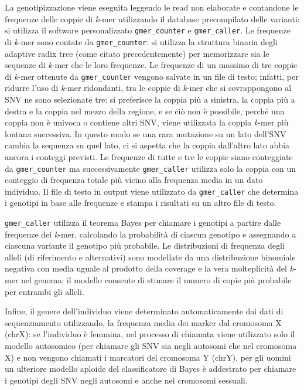 \documentclass[../main.tex]{subfiles}
\begin{document}
\noindent
La genotipizzazione viene eseguita leggendo le read non elaborate e contandone le frequenze delle coppie di \textit{k}-mer utilizzando il database precompilato delle varianti: si utilizza il software personalizzato \texttt{gmer\_counter} e \texttt{gmer\_caller}. Le frequenze di \textit{k}-mer sono contate da \texttt{gmer\_counter}: si utilizza la struttura binaria degli adaptive radix tree (come citato precedentemente) per memorizzare sia le sequenze di \textit{k}-mer che le loro frequenze. Le frequenze di un massimo di tre coppie di \textit{k}-mer ottenute da \texttt{gmer\_counter} vengono salvate in un file di testo; infatti, per ridurre l'uso di \textit{k}-mer ridondanti, tra le coppie di \textit{k}-mer che si sovrappongono al SNV ne sono selezionate tre: si preferisce la coppia più a sinistra, la coppia più a destra e la coppia nel mezzo della regione, e se ciò non è possibile, perché una coppia non è univoca o contiene altri SNV, viene utilizzata la coppia \textit{k}-mer più lontana successiva. In questo modo se una rara mutazione su un lato dell'SNV cambia la sequenza su quel lato, ci si aspetta che la coppia dall'altro lato abbia ancora i conteggi previsti. Le frequenze di tutte e tre le coppie siano conteggiate da \texttt{gmer\_counter} ma successivamente \texttt{gmer\_caller} utilizza solo la coppia con un conteggio di frequenza totale più vicino alla frequenza media in un dato individuo. Il file di testo in output viene utilizzato da \texttt{gmer\_caller} che determina i genotipi in base alle frequenze e stampa i risultati su un altro file di testo. 

\texttt{gmer\_caller} utilizza il teorema Bayes per chiamare i genotipi a partire dalle frequenze dei \textit{k}-mer, calcolando la probabilità di ciascun genotipo e assegnando a ciascuna variante il genotipo più probabile. Le distribuzioni di frequenza degli alleli (di riferimento e alternativi) sono modellate da una distribuzione binomiale negativa con media uguale al prodotto della coverage e la vera molteplicità del \textit{k}-mer nel genoma; il modello consente di stimare il numero di copie più probabile per entrambi gli alleli. 


Infine, il genere dell'individuo viene determinato automaticamente dai dati di sequenziamento utilizzando, la frequenza media dei marker dal cromosoma X (chrX): se l'individuo è femmina, nel processo di chiamata viene utilizzato solo il modello autosomico (per chiamare gli SNV sia negli autosomi che nel cromosoma X) e non vengono chiamati i marcatori del cromosoma Y (chrY), per gli uomini un ulteriore modello aploide del classificatore di Bayes è addestrato per chiamare i genotipi degli SNV negli autosomi e anche nei cromosomi sessuali.
\end{document}
